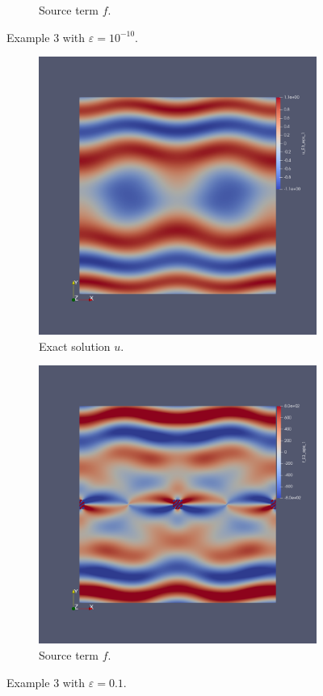 \documentclass[12pt]{ociamthesis}
\begin{document}
\begin{figure}[H]
\begin{subfigure}{0.5\textwidth}
     \caption{Source term $f$.}
 \end{subfigure}
 \caption{Example $3$ with $\varepsilon = 10^{-10}$.} \label{E3_uf}
\end{figure}
\begin{figure}[H]
 \begin{subfigure}{0.5\textwidth}
     \includegraphics[width=\textwidth]{Pics/uf/U_E3_ep1.png}
     \caption{Exact solution $u$.}
 \end{subfigure}
   \begin{subfigure}{0.5\textwidth}
     \includegraphics[width=\textwidth]{Pics/uf/F_E3_eps_1.png}
     \caption{Source term $f$.}
 \end{subfigure}
 \caption{Example $3$ with $\varepsilon = 0.1$.} \label{E3_uf_01}
\end{figure}
\end{document}
